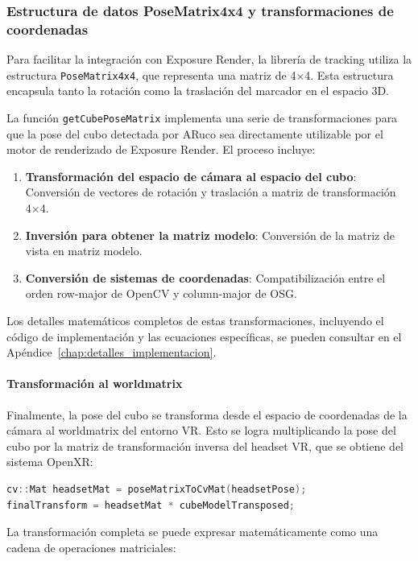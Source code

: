 \subsubsection{Estructura de datos PoseMatrix4x4 y transformaciones de coordenadas}

Para facilitar la integración con Exposure Render, la librería de tracking utiliza la estructura \texttt{PoseMatrix4x4}, que representa una matriz de 4×4. Esta estructura encapsula tanto la rotación como la traslación del marcador en el espacio 3D.

La función \texttt{getCubePoseMatrix} implementa una serie de transformaciones para que la pose del cubo detectada por ARuco sea directamente utilizable por el motor de renderizado de Exposure Render. El proceso incluye:

\begin{enumerate}
    \item \textbf{Transformación del espacio de cámara al espacio del cubo}: Conversión de vectores de rotación y traslación a matriz de transformación 4×4.
    \item \textbf{Inversión para obtener la matriz modelo}: Conversión de la matriz de vista en matriz modelo.
    \item \textbf{Conversión de sistemas de coordenadas}: Compatibilización entre el orden row-major de OpenCV y column-major de OSG.
\end{enumerate}

Los detalles matemáticos completos de estas transformaciones, incluyendo el código de implementación y las ecuaciones específicas, se pueden consultar en el Apéndice~\ref{chap:detalles_implementacion}.




\paragraph{Transformación al \gls{worldmatrix}}
Finalmente, la pose del cubo se transforma desde el espacio de coordenadas de la cámara al \gls{worldmatrix} del entorno VR. Esto se logra multiplicando la pose del cubo por la matriz de transformación inversa del headset VR, que se obtiene del sistema OpenXR:

\begin{lstlisting}[language=C++]
cv::Mat headsetMat = poseMatrixToCvMat(headsetPose);
finalTransform = headsetMat * cubeModelTransposed;
\end{lstlisting}

La transformación completa se puede expresar matemáticamente como una cadena de operaciones matriciales:

